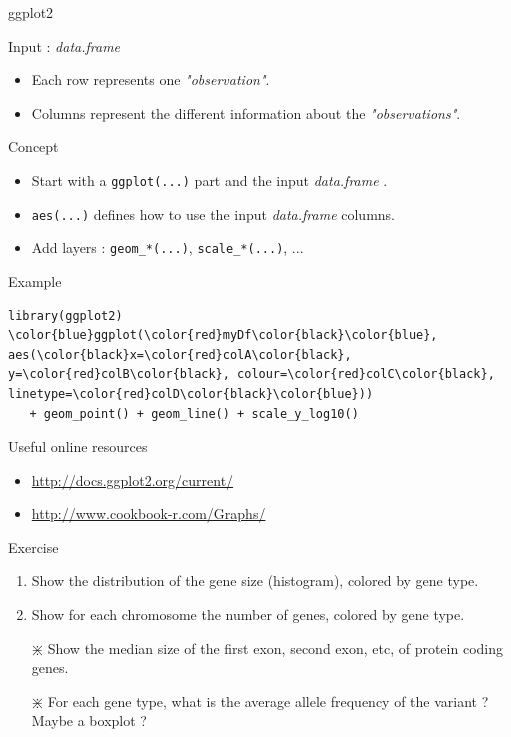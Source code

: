 \documentclass[10pt]{beamer}
\newcommand{\df}{{\it data.frame} }
\begin{document}
\begin{frame}[fragile, shrink=10]{{\sf ggplot2}}
  \begin{block}{Input : \df}
    \begin{itemize}
    \item Each row represents one {\it "observation"}.
    \item Columns represent the different information about the {\it "observations"}.
    \end{itemize}
  \end{block}

  \begin{block}{Concept}
    \begin{itemize}
    \item Start with a \verb!ggplot(...)! part and the input \df.
    \item \verb!aes(...)! defines how to use the input \df columns.
    \item Add layers : \verb!geom_*(...)!, \verb!scale_*(...)!, ...
    \end{itemize}
  \end{block}

  \begin{exampleblock}{Example}
\begin{Verbatim}[commandchars=\\\{\}]
library(ggplot2)
\color{blue}ggplot(\color{red}myDf\color{black}\color{blue}, aes(\color{black}x=\color{red}colA\color{black}, y=\color{red}colB\color{black}, colour=\color{red}colC\color{black}, linetype=\color{red}colD\color{black}\color{blue}))
   + geom_point() + geom_line() + scale_y_log10()
\end{Verbatim}
  \end{exampleblock}

  \begin{block}{Useful online resources}
    \begin{itemize}
    \item \url{http://docs.ggplot2.org/current/}
    \item \url{http://www.cookbook-r.com/Graphs/}
    \end{itemize}
  \end{block}

\end{frame}

\begin{frame}{Exercise}
  \begin{enumerate}
  \item Show the distribution of the gene size (histogram), colored by gene type.
  \item Show for each chromosome the number of genes, colored by gene type.
  \item[$\divideontimes$] Show the median size of the first exon, second exon, etc, of protein coding genes.
  \item[$\divideontimes$] For each gene type, what is the average allele frequency of the variant ? Maybe a boxplot ?
  \end{enumerate}
\end{frame}
\end{document}
